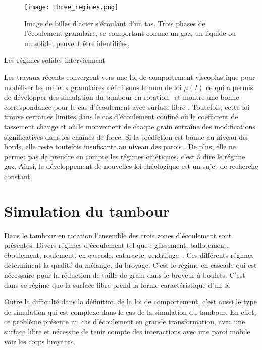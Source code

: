 \begin{figure}
    \texttt{[image: three\_regimes.png]}
    \caption{Image de billes d'acier s'écoulant d'un tas. Trois phases de l'écoulement granulaire, se comportant comme un gaz, un liquide ou un solide, peuvent être identifiées.~\cite{forterre_flows_2008}}
\end{figure}

Les régimes solides interviennent

Les travaux récents convergent vers une loi de comportement viscoplastique pour modéliser les milieux granulaires défini sous le nom de loi $\mu(I)$ \cite{gdr_midi_dense_2004,jop_constitutive_2006} ce qui a permis de développer des simulation du tambour en rotation~\cite{Cortet_2009} et montre une bonne correspondance pour le cas d'écoulement avec surface libre \cite{chou_cross-sectional_2009}.
Toutefois, cette loi trouve certaines limites dans le cas d'écoulement confiné où le coefficient de tassement change et où le mouvement de chaque grain entraîne des modifications significatives dans les chaînes de force. Si la prédiction est bonne au niveau des bords, elle reste toutefois insufisante au niveau des parois \cite{Rognon_Miller_Metzger_Einav_2015}. De plus, elle ne permet pas de prendre en compte les régimes cinétiques, c'est à dire le régime gaz. Ainsi, le développement de nouvelles loi rhéologique est un sujet de recherche constant.

\section{Simulation du tambour}\label{sec:simu_broyeur}

Dans le tambour en rotation l'ensemble des trois zones d'écoulement sont présentes. Divers régimes d'écoulement tel que : glissement, ballotement, éboulement, roulement, en cascade, cataracte,  centrifuge~\cite{MELLMANN2001251}.
Ces différents régimes déterminent la qualité du mélange, du broyage. C'est le régime en cascade qui est nécessaire pour la réduction de taille de grain dans le broyeur à boulets. C'est dans ce régime que la surface libre prend la forme caractéristique d'un \textit{S}.

Outre la difficulté dans la définition de la loi de comportement, c'est aussi le type de simulation qui est complexe dans le cas de la simulation du tambour. En effet, ce problème présente un cas d'écoulement en grande transformation, avec une surface libre et nécessite de tenir compte des interactions avec une paroi mobile voir les corps broyants.

